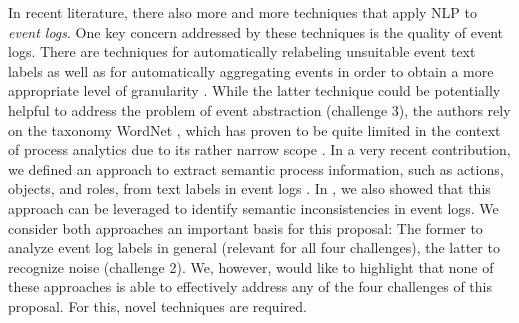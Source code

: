 In recent literature, there also more and more techniques that apply NLP to \textit{event logs}. One key concern addressed by these techniques is the quality of event logs. There are techniques for automatically relabeling unsuitable event text labels \cite{ramos2021nlp} as well as for automatically aggregating events in order to obtain a more appropriate level of granularity \cite{deokar2015semantics}. While the latter technique could be potentially helpful to address the problem of event abstraction (challenge 3), the authors rely on the taxonomy WordNet \cite{miller1995wordnet}, which has proven to be quite limited in the context of process analytics due to its rather narrow scope \cite{leopold2015towards}. In a very recent contribution, we defined an approach to extract semantic process information, such as actions, objects, and roles, from text labels in event logs \cite{rebmann2021extracting}. In \cite{van2021natural}, we also showed that this approach can be leveraged to identify semantic inconsistencies in event logs. We consider both approaches an important basis for this proposal: The former to analyze event log labels in general (relevant for all four challenges), the latter to recognize noise (challenge 2). We, however, would like to highlight that none of these approaches is able to effectively address any of the four challenges of this proposal. For this, novel techniques are required.

 \noindent{}




